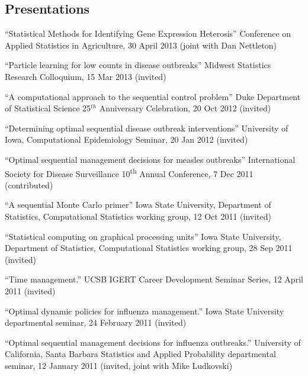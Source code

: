 \documentclass[overlapped,line,letterpaper]{res}
\begin{document}
\begin{resume}

\section{\bf Presentations}

%

{\small

``Statistical Methods for Identifying Gene Expression Heterosis'' Conference on Applied Statistics in Agriculture, 30 April 2013 (joint with Dan Nettleton)

``Particle learning for low counts in disease outbreaks'' Midwest Statistics Research Colloquium, 15 Mar 2013 (invited)

``A computational approach to the sequential control problem'' Duke Department of Statistical Science 25$^{th}$ Anniversary Celebration, 20 Oct 2012 (invited)

``Determining optimal sequential disease outbreak interventions'' University of Iowa, Computational Epidemiology Seminar, 20 Jan 2012 (invited)

``Optimal sequential management decisions for measles outbreaks'' International Society for Disease Surveillance 10\textsuperscript{th} Annual Conference, 7 Dec 2011 (contributed)

``A sequential Monte Carlo primer'' Iowa State University, Department of Statistics, Computational Statistics working group, 12 Oct 2011 (invited)

``Statistical computing on graphical processing units'' Iowa State University, Department of Statistics, Computational Statistics working group, 28 Sep 2011 (invited)

``Time management.'' UCSB IGERT Career Development Seminar Series, 12 April 2011 (invited)

``Optimal dynamic policies for influenza management.'' Iowa State University departmental seminar, 24 February 2011 (invited)

``Optimal sequential management decisions for influenza outbreaks.'' University of California, Santa Barbara Statistics and Applied Probability departmental seminar, 12 January 2011 (invited, joint with Mike Ludkovski)

}
\end{resume}
\end{document}

